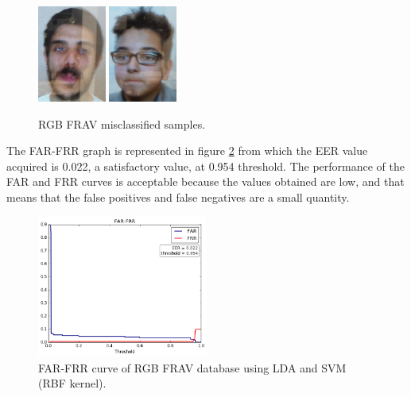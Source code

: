 \begin{figure}[htb]
\centering
\includegraphics[width=0.2\textwidth]{images_databases/frav_tablet_109.JPG}
\includegraphics[width=0.2\textwidth]{images_databases/frav_tablet_162.JPG}
\caption{RGB FRAV misclassified samples.} \label{fig:frav_miscl}
\end{figure}

The FAR-FRR graph is represented in figure \ref{fig:RGB_FRAV_FAR_FRR} from which the EER value acquired is 0.022, a satisfactory value, at 0.954 threshold. The performance of the FAR and FRR curves is acceptable because the values obtained are low, and that means that the false positives and false negatives are a small quantity.\\

\begin{figure}[htb]
\centering
\includegraphics[width=0.5\textwidth]{images/FAR-FRR/FRAV_LDA_SVM_RBF_FAR_FRR.png}
\caption{FAR-FRR curve of RGB FRAV database using LDA and SVM (RBF kernel).} \label{fig:RGB_FRAV_FAR_FRR}
\end{figure}



